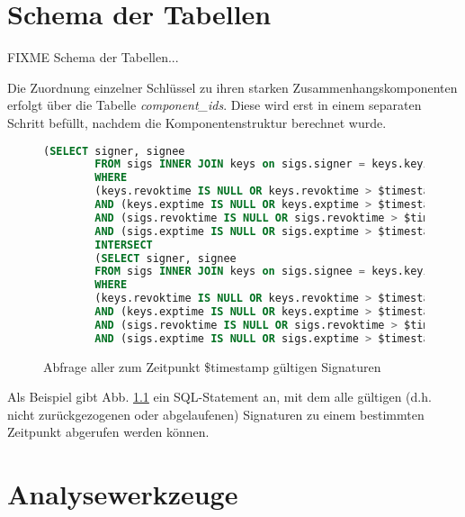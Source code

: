 \begin{appendix}
  \chapter{Schema der Tabellen}
  \label{sec:schema-der-tabellen}

  FIXME Schema der Tabellen...

  Die Zuordnung einzelner Schlüssel zu ihren starken
  Zusammenhangskomponenten erfolgt über die Tabelle
  \emph{component\_ids}. Diese wird erst in einem separaten Schritt
  befüllt, nachdem die Komponentenstruktur berechnet wurde.

  \begin{figure}[h]
    \centering
    {\scriptsize
      \begin{lstlisting}[language=SQL]
        (SELECT signer, signee
        FROM sigs INNER JOIN keys on sigs.signer = keys.keyid 
        WHERE 
        (keys.revoktime IS NULL OR keys.revoktime > $timestamp) 
        AND (keys.exptime IS NULL OR keys.exptime > $timestamp)
        AND (sigs.revoktime IS NULL OR sigs.revoktime > $timestamp) 
        AND (sigs.exptime IS NULL OR sigs.exptime > $timestamp)) 
        INTERSECT 
        (SELECT signer, signee 
        FROM sigs INNER JOIN keys on sigs.signee = keys.keyid
        WHERE 
        (keys.revoktime IS NULL OR keys.revoktime > $timestamp) 
        AND (keys.exptime IS NULL OR keys.exptime > $timestamp) 
        AND (sigs.revoktime IS NULL OR sigs.revoktime > $timestamp) 
        AND (sigs.exptime IS NULL OR sigs.exptime > $timestamp))"
      \end{lstlisting}
    }
    \caption{Abfrage aller zum Zeitpunkt \$timestamp gültigen Signaturen}
    \label{fig:all-valid-keys}
  \end{figure}


  Als Beispiel gibt Abb. \ref{fig:all-valid-keys} ein SQL-Statement an,
  mit dem alle gültigen (d.h. nicht zurückgezogenen oder abgelaufenen)
  Signaturen zu einem bestimmten Zeitpunkt abgerufen werden können.

\chapter{Analysewerkzeuge}
\label{cha:analysewerkzeuge}


\begin{table}


\end{table}
\end{appendix}
